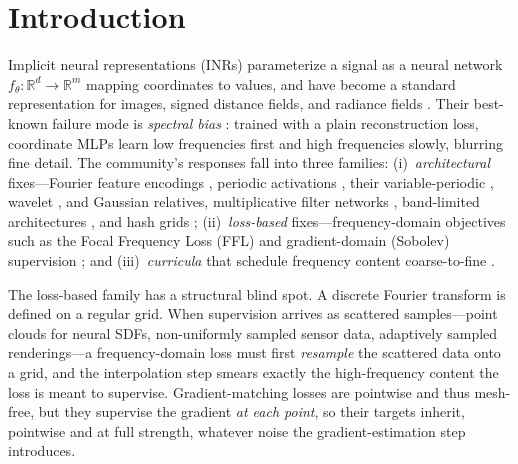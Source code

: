 \documentclass[10pt]{article}
\newcommand{\R}{\mathbb{R}}
\begin{document}
\section{Introduction}
\label{sec:intro}

Implicit neural representations (INRs) parameterize a signal as a neural network
$f_\theta:\R^d\to\R^m$ mapping coordinates to values, and have become a standard
representation for images, signed distance fields, and radiance fields
\citep{sitzmann2020siren,park2019deepsdf,mildenhall2020nerf,xie2022neuralfields}. Their
best-known failure mode is \emph{spectral bias}
\citep{rahaman2019spectral,basri2020frequency}: trained with a plain reconstruction
loss, coordinate MLPs learn low frequencies first and high frequencies slowly, blurring
fine detail. The community's responses fall into three families: (i)~\emph{architectural}
fixes---Fourier feature encodings \citep{tancik2020fourier}, periodic activations
\citep{sitzmann2020siren}, their variable-periodic \citep{liu2024finer}, wavelet
\citep{saragadam2023wire}, and Gaussian \citep{ramasinghe2022beyond} relatives,
multiplicative filter networks \citep{fathony2021mfn}, band-limited architectures
\citep{lindell2022bacon}, and hash grids \citep{muller2022instant};
(ii)~\emph{loss-based} fixes---frequency-domain objectives such as the Focal Frequency
Loss (FFL) \citep{jiang2021ffl} and gradient-domain (Sobolev) supervision
\citep{czarnecki2017sobolev,yuan2022sobolev}; and (iii)~\emph{curricula} that schedule
frequency content coarse-to-fine \citep{hertz2021sape,yang2023freenerf}.

The loss-based family has a structural blind spot. A discrete Fourier transform is
defined on a regular grid. When supervision arrives as scattered samples---point clouds
for neural SDFs, non-uniformly sampled sensor data, adaptively sampled renderings---a
frequency-domain loss must first \emph{resample} the scattered data onto a grid, and the
interpolation step smears exactly the high-frequency content the loss is meant to
supervise. Gradient-matching losses are pointwise and thus mesh-free, but they supervise
the gradient \emph{at each point}, so their targets inherit, pointwise and at full
strength, whatever noise the gradient-estimation step introduces.
\end{document}

